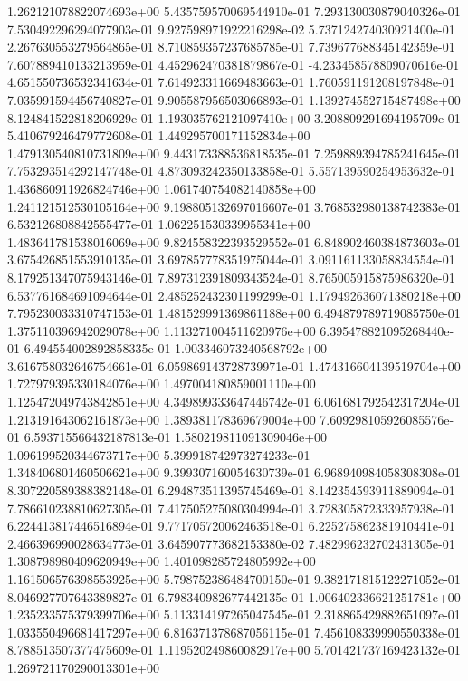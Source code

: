 1.262121078822074693e+00
5.435759570069544910e-01
7.293130030879040326e-01
7.530492296294077903e-01
9.927598971922216298e-02
5.737124274030921400e-01
2.267630553279564865e-01
8.710859357237685785e-01
7.739677688345142359e-01
7.607889410133213959e-01
4.452962470381879867e-01
-4.233458578809070616e-01
4.651550736532341634e-01
7.614923311669483663e-01
1.760591191208197848e-01
7.035991594456740827e-01
9.905587956503066893e-01
1.139274552715487498e+00
8.124841522818206929e-01
1.193035762121097410e+00
3.208809291694195709e-01
5.410679246479772608e-01
1.449295700171152834e+00
1.479130540810731809e+00
9.443173388536818535e-01
7.259889394785241645e-01
7.753293514292147748e-01
4.873093242350133858e-01
5.557139590254953632e-01
1.436860911926824746e+00
1.061740754082140858e+00
1.241121512530105164e+00
9.198805132697016607e-01
3.768532980138742383e-01
6.532126808842555477e-01
1.062251530339955341e+00
1.483641781538016069e+00
9.824558322393529552e-01
6.848902460384873603e-01
3.675426851553910135e-01
3.697857778351975044e-01
3.091161133058834554e-01
8.179251347075943146e-01
7.897312391809343524e-01
8.765005915875986320e-01
6.537761684691094644e-01
2.485252432301199299e-01
1.179492636071380218e+00
7.795230033310747153e-01
1.481529991369861188e+00
6.494879789719085750e-01
1.375110396942029078e+00
1.113271004511620976e+00
6.395478821095268440e-01
6.494554002892858335e-01
1.003346073240568792e+00
3.616758032646754661e-01
6.059869143728739971e-01
1.474316604139519704e+00
1.727979395330184076e+00
1.497004180859001110e+00
1.125472049743842851e+00
4.349899333647446742e-01
6.061681792542317204e-01
1.213191643062161873e+00
1.389381178369679004e+00
7.609298105926085576e-01
6.593715566432187813e-01
1.580219811091309046e+00
1.096199520344673717e+00
5.399918742973274233e-01
1.348406801460506621e+00
9.399307160054630739e-01
6.968940984058308308e-01
8.307220589388382148e-01
6.294873511395745469e-01
8.142354593911889094e-01
7.786610238810627305e-01
7.417505275080304994e-01
3.728305872333957938e-01
6.224413817446516894e-01
9.771705720062463518e-01
6.225275862381910441e-01
2.466396990028634773e-01
3.645907773682153380e-02
7.482996232702431305e-01
1.308798980409620949e+00
1.401098285724805992e+00
1.161506576398553925e+00
5.798752386484700150e-01
9.382171815122271052e-01
8.046927707643389827e-01
6.798340982677442135e-01
1.006402336621251781e+00
1.235233575379399706e+00
5.113314197265047545e-01
2.318865429882651097e-01
1.033550496681417297e+00
6.816371378687056115e-01
7.456108339990550338e-01
8.788513507377475609e-01
1.119520249860082917e+00
5.701421737169423132e-01
1.269721170290013301e+00
